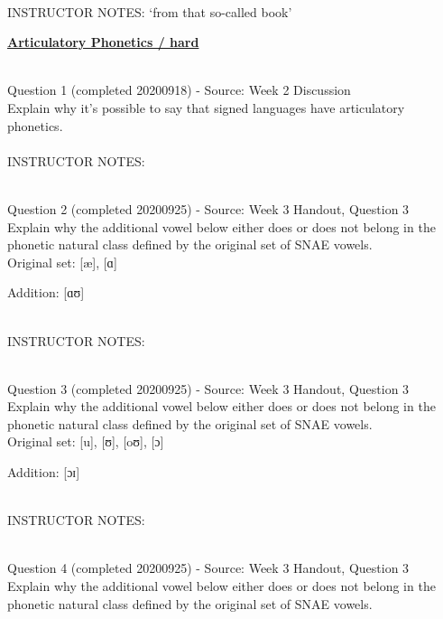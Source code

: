 \documentclass[12pt]{article}
\begin{document}
~\\
INSTRUCTOR NOTES: ‘from that so-called book’


\newpage\textbf{\underline{\huge Articulatory Phonetics / hard\\}}

~\\

{\large Question 1} (completed 20200918) - Source: Week 2 Discussion\\

Explain why it's possible to say that signed languages have articulatory phonetics.\\


~\\
INSTRUCTOR NOTES: 


~\\

{\large Question 2} (completed 20200925) - Source: Week 3 Handout, Question 3\\

Explain why the additional vowel below either does or does not belong in the phonetic natural class defined by the original set of SNAE vowels.\\

Original set: {[æ]}, {[ɑ]}

Addition: {[ɑʊ]}


~\\
INSTRUCTOR NOTES: 


~\\

{\large Question 3} (completed 20200925) - Source: Week 3 Handout, Question 3\\

Explain why the additional vowel below either does or does not belong in the phonetic natural class defined by the original set of SNAE vowels.\\

Original set: {[u]}, {[ʊ]}, {[oʊ]}, {[ɔ]}

Addition: {[ɔɪ]}


~\\
INSTRUCTOR NOTES: 


~\\

{\large Question 4} (completed 20200925) - Source: Week 3 Handout, Question 3\\

Explain why the additional vowel below either does or does not belong in the phonetic natural class defined by the original set of SNAE vowels.\\
\end{document}
